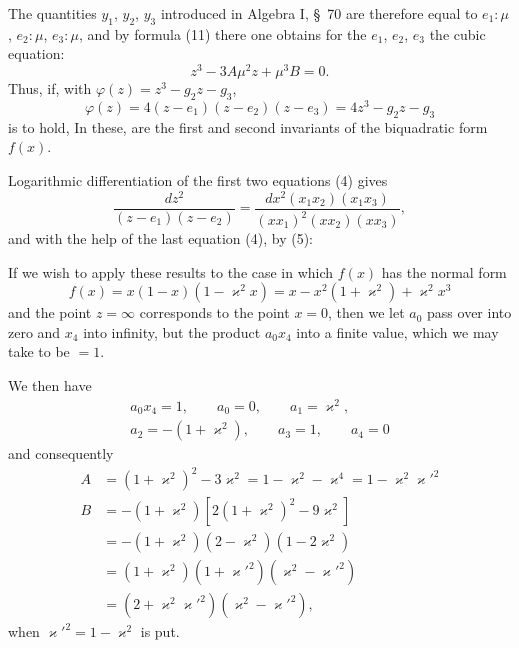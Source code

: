 
The quantities $y_1$, $y_2$, $y_3$ introduced in Algebra I, \S\ 70 are therefore equal to $e_1{:}\mu$, $e_2{:}\mu$, $e_3{:}\mu$, and by formula (11) there one obtains for the $e_1$, $e_2$, $e_3$ the cubic equation:
\[
z^3 - 3A\mu^2 z + \mu^3 B = 0.
\]
Thus, if, with $\varphi(z) = z^3 - g_2 z - g_3$, %
\[
\varphi(z) = 4(z-e_1)(z-e_2)(z-e_3) = 4z^3 - g_2 z - g_3
\]
is to hold,
In these,
are the first and second invariants of the biquadratic form $f(x)$.

Logarithmic differentiation of the first two equations (4) gives
\[
\frac{dz^2}{(z-e_1)(z-e_2)} = \frac{dx^2(x_1x_2)(x_1x_3)}{(xx_1)^2(xx_2)(xx_3)},
\]
and with the help of the last equation (4), by (5):

If we wish to apply these results to the case in which $f(x)$ has the normal form
\[
f(x) = x(1-x)(1-\varkappa^2x) = x - x^2(1+\varkappa^2) + \varkappa^2x^3
\]
and the point $z=\infty$ corresponds to the point $x=0$, then we let $a_0$ pass over into zero and $x_4$ into infinity, but the product $a_0x_4$ into a finite value, which we may take to be $=1$.

We then have
\[
\begin{gathered}
a_0x_4 = 1, \qquad a_0 = 0, \qquad a_1 = \varkappa^2,\\
a_2 = -(1+\varkappa^2), \qquad a_3 = 1, \qquad a_4 = 0
\end{gathered}
\]
and consequently
\[
\begin{aligned}
A &= (1+\varkappa^2)^2 - 3\varkappa^2 = 1 - \varkappa^2 - \varkappa^4 = 1 - \varkappa^2\varkappa'^2 %
\\
B &= -(1+\varkappa^2)[2(1+\varkappa^2)^2 - 9\varkappa^2]\\
&= -(1+\varkappa^2)(2-\varkappa^2)(1-2\varkappa^2)\\
&= (1+\varkappa^2)(1+\varkappa'^2)(\varkappa^2-\varkappa'^2)\\
&= (2+\varkappa^2\varkappa'^2)(\varkappa^2-\varkappa'^2),
\end{aligned}
\]
when $\varkappa'^2 = 1 - \varkappa^2$ is put.
